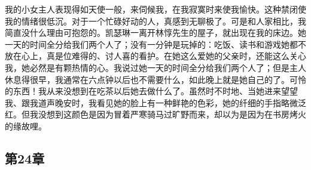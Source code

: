 \par 我的小女主人表现得如天使一般，来伺候我，在我寂寞时来使我愉快。这种禁闭使我的情绪很低沉。对于一个忙碌好动的人，真感到无聊极了。可是和人家相比，我简直没什么理由可抱怨的。凯瑟琳一离开林惇先生的屋子，就出现在我的床边。她一天的时间全分给我们两个人了；没有一分钟是玩掉的：吃饭、读书和游戏她都不放在心上，真是位难得的、讨人喜的看护。在她这么爱她的父亲时，还能这么关心我，她必然是有颗热情的心。我说过她一天的时间全分给我们两个人了；但是主人休息得很早，我通常在六点钟以后也不需要什么，如此晚上就是她自己的了。可怜的东西！我从来没想到在吃茶以后她去做什么了。虽然时不时地、当她进来望望我、跟我道声晚安时，我看见她的脸上有一种鲜艳的色彩，她的纤细的手指略微泛红。但我没想到这颜色是因为冒着严寒骑马过旷野而来，却以为是因为在书房烤火的缘故哩。


\subsection{第24章}

